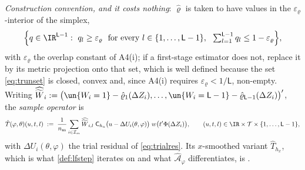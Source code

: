 \begin{definition}
\emph{Construction convention, and it costs nothing}: $\hat\varrho$ is taken to have values in the
$\varepsilon_\varrho$-interior of the simplex,
\begin{equation}\label{eq:trunset}
\Big\{q\in\IR^{\mathsf L-1}:\ q_l\ge\varepsilon_\varrho\ \text{ for every }l\in\{1,\dots,\mathsf L-1\},\ \ \textstyle\sum_{l=1}^{\mathsf L-1}q_l\le1-\varepsilon_\varrho\Big\},
\end{equation}
with $\varepsilon_\varrho$ the overlap constant of
A4(i); if a first-stage estimator does not, replace it by its metric projection onto that
set, which is well defined because the set \eqref{eq:trunset} is closed, convex and, since
A4(i) requires $\varepsilon_\varrho<1/\mathsf L$, non-empty.
Writing $\widehat{\widetilde W}_{i}:=\big(\un\{W_i=1\}-\hat\varrho_1(\Delta Z_i),\dots,\un\{W_i=\mathsf L-1\}-\hat\varrho_{\mathsf L-1}(\Delta Z_i)\big)'$,
the \emph{sample operator} is
\begin{equation}\label{eq:hatT}
\hat T(\varphi,\theta)(u,t,l)\;:=\;\frac1{n_{\mathrm m}}\sum_{i\in\mathcal I_m}
\widehat{\widetilde W}_{i,l}\;\mathsf C_{h_u}\big(u-\Delta U_i(\theta,\varphi)\big)\;w\big(t'\Phi(\Delta Z_i)\big),
\qquad(u,t,l)\in\IR\times\mathcal T\times\{1,\dots,\mathsf L-1\} ,
\end{equation}
with $\Delta U_i(\theta,\varphi)$ the trial residual of \eqref{eq:trialres}. Its $x$-smoothed variant
$\hat T_{h_x}$, which is what \cref{def:lfstep} iterates on and what
$\hat{\mathcal A}_\varphi$ differentiates, is .
\end{definition}

